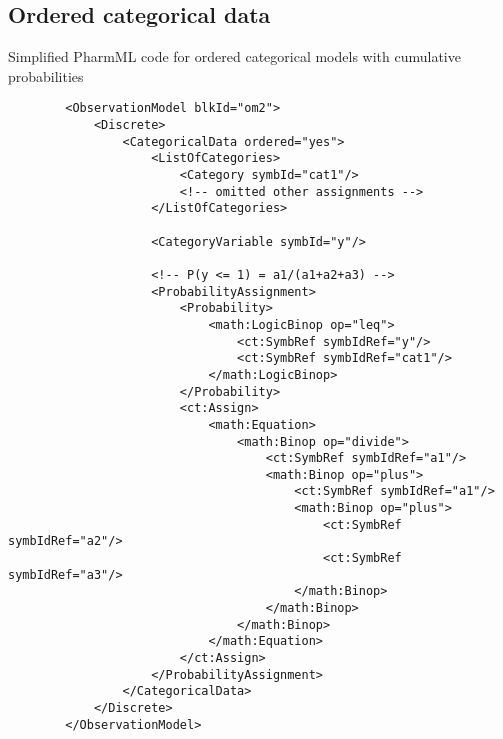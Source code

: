 \subsection{Ordered categorical data}
Simplified PharmML code for ordered categorical models with cumulative probabilities
\lstset{language=XML}
\begin{lstlisting}
        <ObservationModel blkId="om2">
            <Discrete>
                <CategoricalData ordered="yes">
                    <ListOfCategories> 
                        <Category symbId="cat1"/>
                        <!-- omitted other assignments -->
                    </ListOfCategories>
                    
                    <CategoryVariable symbId="y"/>
                    
                    <!-- P(y <= 1) = a1/(a1+a2+a3) --> 
                    <ProbabilityAssignment>
                        <Probability>
                            <math:LogicBinop op="leq">
                                <ct:SymbRef symbIdRef="y"/>
                                <ct:SymbRef symbIdRef="cat1"/>
                            </math:LogicBinop>
                        </Probability>
                        <ct:Assign>
                            <math:Equation>
                                <math:Binop op="divide">
                                    <ct:SymbRef symbIdRef="a1"/>
                                    <math:Binop op="plus">
                                        <ct:SymbRef symbIdRef="a1"/>
                                        <math:Binop op="plus">
                                            <ct:SymbRef symbIdRef="a2"/>
                                            <ct:SymbRef symbIdRef="a3"/>
                                        </math:Binop>
                                    </math:Binop>
                                </math:Binop>
                            </math:Equation>
                        </ct:Assign>
                    </ProbabilityAssignment>
                </CategoricalData>
            </Discrete>
        </ObservationModel>
\end{lstlisting}

